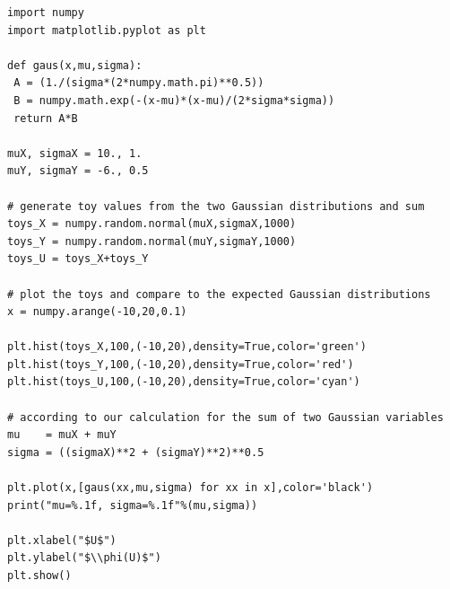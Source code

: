 \begin{lstlisting}[style = Python]
import numpy
import matplotlib.pyplot as plt

def gaus(x,mu,sigma):
 A = (1./(sigma*(2*numpy.math.pi)**0.5))
 B = numpy.math.exp(-(x-mu)*(x-mu)/(2*sigma*sigma))
 return A*B
 
muX, sigmaX = 10., 1.
muY, sigmaY = -6., 0.5

# generate toy values from the two Gaussian distributions and sum
toys_X = numpy.random.normal(muX,sigmaX,1000)
toys_Y = numpy.random.normal(muY,sigmaY,1000)
toys_U = toys_X+toys_Y

# plot the toys and compare to the expected Gaussian distributions
x = numpy.arange(-10,20,0.1)

plt.hist(toys_X,100,(-10,20),density=True,color='green')
plt.hist(toys_Y,100,(-10,20),density=True,color='red')
plt.hist(toys_U,100,(-10,20),density=True,color='cyan')

# according to our calculation for the sum of two Gaussian variables
mu    = muX + muY
sigma = ((sigmaX)**2 + (sigmaY)**2)**0.5

plt.plot(x,[gaus(xx,mu,sigma) for xx in x],color='black')
print("mu=%.1f, sigma=%.1f"%(mu,sigma))

plt.xlabel("$U$")
plt.ylabel("$\\phi(U)$")
plt.show()
\end{lstlisting}

